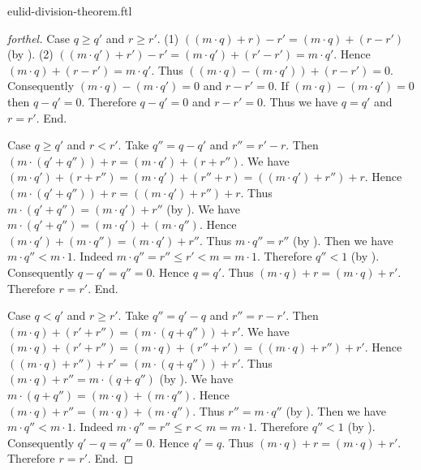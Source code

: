 \documentclass{naproche-library}
\begin{document}
\begin{smodule}{eulid-division-theorem.ftl}
\begin{proof}[forthel]
    Case $q \geq q'$ and $r \geq r'$.
      (1) $((m \cdot q) + r) - r' = (m \cdot q) + (r - r')$ (by ).
      (2) $((m \cdot q') + r') - r'
        = (m \cdot q') + (r' - r')
        = m \cdot q'$.
      Hence $(m \cdot q) + (r - r') = m \cdot q'$.
      Thus $((m \cdot q) - (m \cdot q')) + (r - r') = 0$.
      Consequently $(m \cdot q) - (m \cdot q') = 0$ and $r - r' = 0$.
      If $(m \cdot q) - (m \cdot q') = 0$ then $q - q' = 0$.
      Therefore $q - q' = 0$ and $r - r' = 0$.
      Thus we have $q = q'$ and $r = r'$.
    End.

    Case $q \geq q'$ and $r < r'$.
      Take $q'' = q - q'$ and $r'' = r' - r$.
      Then $(m \cdot (q' + q'')) + r = (m \cdot q') + (r + r'')$.
      We have $(m \cdot q') + (r + r'')
        = (m \cdot q') + (r'' + r)
        = ((m \cdot q') + r'') + r$.
      Hence $(m \cdot (q' + q'')) + r = ((m \cdot q') + r'') + r$.
      Thus $m \cdot (q' + q'') = (m \cdot q') + r''$ (by ).
      We have $m \cdot (q' + q'') = (m \cdot q') + (m \cdot q'')$.
      Hence $(m \cdot q') + (m \cdot q'') = (m \cdot q') + r''$.
      Thus $m \cdot q'' = r''$ (by ).
      Then we have $m \cdot q'' < m \cdot 1$.
      Indeed $m \cdot q''
        = r''
        \leq r'
        < m
        = m \cdot 1$.
      Therefore $q'' < 1$ (by ).
      Consequently $q - q' = q'' = 0$.
      Hence $q = q'$.
      Thus $(m \cdot q) + r = (m \cdot q) + r'$.
      Therefore $r = r'$.
    End.

    Case $q < q'$ and $r \geq r'$.
      Take $q'' = q' - q$ and $r'' = r - r'$.
      Then $(m \cdot q) + (r' + r'') = (m \cdot (q + q'')) + r'$.
      We have $(m \cdot q) + (r' + r'')
        = (m \cdot q) + (r'' + r')
        = ((m \cdot q) + r'') + r'$.
      Hence $((m \cdot q) + r'') + r' = (m \cdot (q + q'')) + r'$.
      Thus $(m \cdot q) + r'' = m \cdot (q + q'')$ (by ).
      We have $m \cdot (q + q'') = (m \cdot q) + (m \cdot q'')$.
      Hence $(m \cdot q) + r'' = (m \cdot q) + (m \cdot q'')$.
      Thus $r'' = m \cdot q''$ (by ).
      Then we have $m \cdot q'' < m \cdot 1$.
      Indeed $m \cdot q''
        = r''
        \leq r
        < m
        = m \cdot 1$.
      Therefore $q'' < 1$ (by ).
      Consequently $q' - q = q'' = 0$.
      Hence $q' = q$.
      Thus $(m \cdot q) + r = (m \cdot q) + r'$.
      Therefore $r = r'$.
    End.


\end{proof}
\end{smodule}
\end{document}
